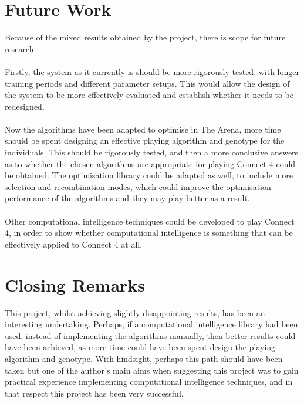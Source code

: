 \section{Future Work}
Because of the mixed results obtained by the project, there is scope for future research.
\\\\Firstly, the system as it currently is should be more rigorously tested, with longer training periods and different parameter setups. This would allow the design of the system to be more effectively evaluated and establish whether it needs to be redesigned.
\\\\Now the algorithms have been adapted to optimise in The Arena, more time should be spent designing an effective playing algorithm and genotype for the individuals. This should be rigorously tested, and then a more conclusive answers as to whether the chosen algorithms are appropriate for playing Connect 4 could be obtained. The optimisation library could be adapted as well, to include more selection and recombination modes, which could improve the optimisation performance of the algorithms and they may play better as a result.
\\\\Other computational intelligence techniques could be developed to play Connect 4, in order to show whether computational intelligence is something that can be effectively applied to Connect 4 at all.

\section{Closing Remarks}
This project, whilst achieving slightly disappointing results, has been an interesting undertaking. Perhaps, if a computational intelligence library had been used, instead of implementing the algorithms manually, then better results could have been achieved, as more time could have been spent design the playing algorithm and genotype. With hindsight, perhaps this path should have been taken but one of the author's main aims when suggesting this project was to gain practical experience implementing computational intelligence techniques, and in that respect this project has been very successful.